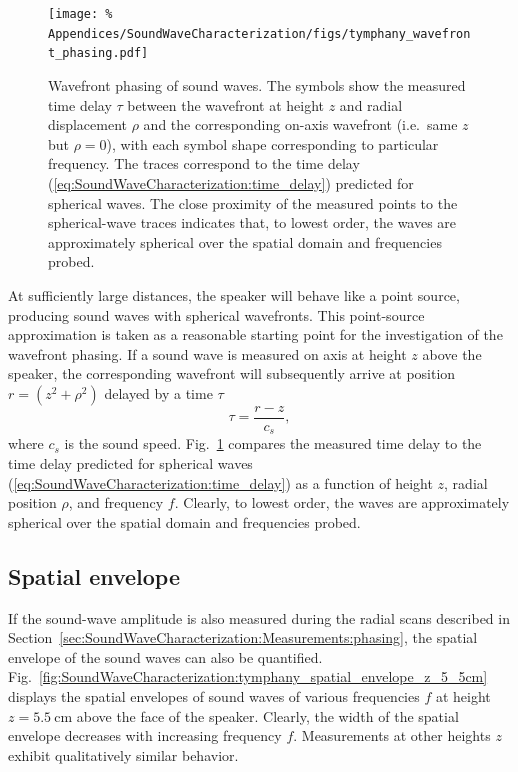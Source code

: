 \begin{figure}
  \centering
  \texttt{[image: \%
    Appendices/SoundWaveCharacterization/figs/tymphany\_wavefront\_phasing.pdf]}
  \caption[Wavefront phasing of sound waves]{%
    Wavefront phasing of sound waves.
    The symbols show the measured time delay $\tau$
    between the wavefront at height $z$ and radial displacement $\rho$ and
    the corresponding on-axis wavefront (i.e.\ same $z$ but $\rho = 0$),
    with each symbol shape corresponding to particular frequency.
    The traces correspond to the time delay
    (\ref{eq:SoundWaveCharacterization:time_delay})
    predicted for spherical waves.
    The close proximity of the measured points to the spherical-wave traces
    indicates that, to lowest order, the waves are approximately spherical
    over the spatial domain and frequencies probed.
  }
\label{fig:SoundWaveCharacterization:tymphany_wavefront_phasing}
\end{figure}

At sufficiently large distances,
the speaker will behave like a point source,
producing sound waves with spherical wavefronts.
This point-source approximation is taken as a reasonable
starting point for the investigation of the wavefront phasing.
If a sound wave is measured on axis at height $z$ above the speaker,
the corresponding wavefront will subsequently arrive
at position $r = (z^2 + \rho^2)$
delayed by a time $\tau$
\begin{equation}
  \tau = \frac{r - z}{c_s},
  \label{eq:SoundWaveCharacterization:time_delay}
\end{equation}
\graffito{\textcolor{red}{value for $c_s$}}
where $c_s$ is the sound speed.
Fig.~\ref{fig:SoundWaveCharacterization:tymphany_wavefront_phasing}
compares the measured time delay to
the time delay predicted for spherical waves
(\ref{eq:SoundWaveCharacterization:time_delay})
as a function of height $z$, radial position $\rho$, and frequency $f$.
Clearly, to lowest order, the waves are approximately spherical
over the spatial domain and frequencies probed.


\subsection{Spatial envelope}
\label{sec:SoundWaveCharacterization:Measurements:envelope}
If the sound-wave amplitude is also measured
during the radial scans described in
Section~\ref{sec:SoundWaveCharacterization:Measurements:phasing},
the spatial envelope of the sound waves can also be quantified.
Fig.~\ref{fig:SoundWaveCharacterization:tymphany_spatial_envelope_z_5_5cm}
displays the spatial envelopes of sound waves of various frequencies $f$
at height $z = \SI{5.5}{\centi\meter}$ above the face of the speaker.
Clearly, the width of the spatial envelope decreases
with increasing frequency $f$.
Measurements at other heights $z$
exhibit qualitatively similar behavior.

